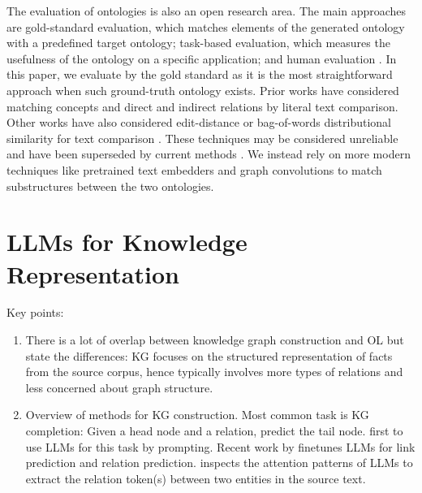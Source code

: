 The evaluation of ontologies is also an open research area. The main approaches are gold-standard evaluation, which matches elements of the generated ontology with a predefined target ontology; task-based evaluation, which measures the usefulness of the ontology on a specific application; and human evaluation \cite{raad2015survey,brank2005survey}. In this paper, we evaluate by the gold standard as it is the most straightforward approach when such ground-truth ontology exists. Prior works have considered matching concepts \cite{maedche2002measuring} and direct and indirect relations \cite{Kashyap2005TaxaMinerAE, Treeratpituk2013GraphbasedAT} by literal text comparison. Other works have also considered edit-distance \cite{Ehrig2005SimilarityFO} or bag-of-words distributional similarity for text comparison \cite{Zavitsanos2011GoldSE}.  These techniques may be considered unreliable and have been superseded by current methods \cite{conneau2017supervised}. We instead rely on more modern techniques like pretrained text embedders \cite{devlin2018bert} and graph convolutions \cite{kipf2016semi} to match substructures between the two ontologies.

\section{LLMs for Knowledge Representation}

Key points:
\begin{enumerate}
    \item There is a lot of overlap between knowledge graph construction and OL but state the differences: KG focuses on the structured representation of facts from the source corpus, hence typically involves more types of relations and less concerned about graph structure.
    \item Overview of methods for KG construction. Most common task is KG completion: Given a head node and a relation, predict the tail node. \citet{petroni2019language} first to use LLMs for this task by prompting. Recent work by \citet{yao2023exploring} finetunes LLMs for link prediction and relation prediction. \citet{wang2020language} inspects the attention patterns of LLMs to extract the relation token(s) between two entities in the source text.
\end{enumerate}